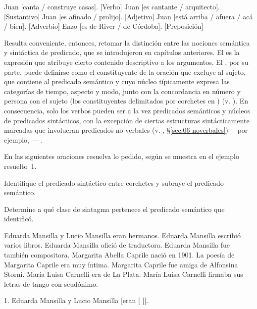 \begin{exe}
  \ex\label{ex:09-clases}
    \begin{xlist}
      \ex Juan [canta / construye casas]. \hfill [Verbo]
      \ex Juan [es cantante / arquitecto]. \hfill [Sustantivo]
      \ex Juan [es afinado / prolijo]. \hfill [Adjetivo]
      \ex Juan [está arriba / afuera / acá / bien]. \hfill [Adverbio]
      \ex Enzo [es de River / de Córdoba]. \hfill [Preposición]
    \end{xlist}
\end{exe}

Resulta conveniente, entonces, retomar la distinción entre las nociones
semántica y sintáctica de predicado, que se introdujeron en capítulos
anteriores. El  es la expresión que atribuye cierto
contenido descriptivo a los argumentos. El , por
su parte, puede definirse como el constituyente de la oración que excluye al
sujeto, que contiene al predicado semántico y cuyo núcleo típicamente expresa
las categorías de tiempo, aspecto y modo, junto con la concordancia en número y
persona con el sujeto (los constituyentes delimitados por corchetes en
) (v. ). En consecuencia, solo los verbos pueden
ser a la vez predicados semánticos y núcleos de predicados sintácticos, con la
excepción de ciertas estructuras sintácticamente marcadas que involucran
predicados no verbales (v. , §\ref{sec:06-noverbales}) ---por ejemplo,
---
\parencite{hernanz1999suner,ditullio2014}.

\begin{ejercicio}\label{ej:09-predicados}
En las siguientes oraciones resuelva lo pedido, según se muestra en el ejemplo
resuelto~1.

\begin{consignas}
  \item Identifique el predicado sintáctico entre corchetes y subraye el
        predicado semántico.
  \item Determine a qué clase de sintagma pertenece el predicado semántico que
        identificó.
\end{consignas}

\begin{exe}
  \ex Eduarda Mansilla y Lucio Mansilla eran hermanos.
  \ex Eduarda Mansilla escribió varios libros.
  \ex Eduarda Mansilla ofició de traductora.
  \ex Eduarda Mansilla fue también compositora.
  \ex Margarita Abella Caprile nació en 1901.
  \ex La poesía de Margarita Caprile era muy íntima.
  \ex Margarita Caprile fue amiga de Alfonsina Storni.
  \ex María Luisa Carnelli era de La Plata.
  \ex María Luisa Carnelli firmaba sus letras de tango con seudónimo.
\end{exe}

\begin{resuelto}
1. Eduarda Mansilla y Lucio Mansilla [eran [ ]].
\end{resuelto}
\end{ejercicio}

